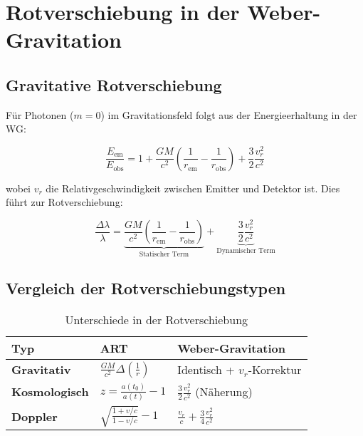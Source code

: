 \newpage
\section{Rotverschiebung in der Weber-Gravitation}
\label{sec:weber_redshift}

\subsection{Gravitative Rotverschiebung}
Für Photonen ($m=0$) im Gravitationsfeld folgt aus der Energieerhaltung in der WG:

\begin{equation}
\frac{E_\text{em}}{E_\text{obs}} = 1 + \frac{GM}{c^2}\left(\frac{1}{r_\text{em}} - \frac{1}{r_\text{obs}}\right) + \frac{3}{2}\frac{v_r^2}{c^2}
\end{equation}

wobei $v_r$ die Relativgeschwindigkeit zwischen Emitter und Detektor ist. Dies führt zur Rotverschiebung:

\begin{equation}
\frac{\Delta\lambda}{\lambda} = \underbrace{\frac{GM}{c^2}\left(\frac{1}{r_\text{em}} - \frac{1}{r_\text{obs}}\right)}_{\text{Statischer Term}} + \underbrace{\frac{3}{2}\frac{v_r^2}{c^2}}_{\text{Dynamischer Term}}
\end{equation}

\subsection{Vergleich der Rotverschiebungstypen}
\begin{table}[h]
\centering
\caption{Unterschiede in der Rotverschiebung}
\begin{tabular}{lll}
\hline
Typ & ART & Weber-Gravitation \\
\hline
\textbf{Gravitativ} & $\frac{GM}{c^2}\Delta\left(\frac{1}{r}\right)$ & Identisch + $v_r$-Korrektur \\
\textbf{Kosmologisch} & $z = \frac{a(t_0)}{a(t)}-1$ & $\frac{3}{2}\frac{v_r^2}{c^2}$ (Näherung) \\
\textbf{Doppler} & $\sqrt{\frac{1+v/c}{1-v/c}}-1$ & $\frac{v_r}{c} + \frac{3}{4}\frac{v_r^2}{c^2}$ \\
\hline
\end{tabular}
\end{table}

